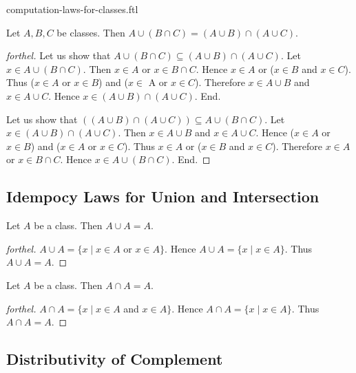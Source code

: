 \documentclass{naproche-library}
\begin{document}
\begin{smodule}{computation-laws-for-classes.ftl}
  \begin{proposition}[forthel,id=FOUNDATIONS_02_5937390721957888,printid]
    Let $A, B, C$ be classes.
    Then $A \cup (B \cap C) = (A \cup B) \cap (A \cup C)$.
  \end{proposition}
  \begin{proof}[forthel]
    Let us show that $A \cup (B \cap C) \subseteq (A \cup B) \cap (A \cup C)$.
      Let $x \in A \cup (B \cap C)$.
      Then $x \in A$ or $x \in B \cap C$.
      Hence $x \in A$ or ($x \in B$ and $x \in C$).
      Thus ($x \in A$ or $x \in B$) and ($x \in$ A or $x \in C$).
      Therefore $x \in A \cup B$ and $x \in A \cup C$.
      Hence $x \in (A \cup B) \cap (A \cup C)$.
    End.

    Let us show that $((A \cup B) \cap (A \cup C)) \subseteq A \cup (B \cap C)$. %
      Let $x \in (A \cup B) \cap (A \cup C)$.
      Then $x \in A \cup B$ and $x \in A \cup C$.
      Hence ($x \in A$ or $x \in B$) and ($x \in A$ or $x \in C$).
      Thus $x \in A$ or ($x \in B$ and $x \in C$).
      Therefore $x \in A$ or $x \in B \cap C$.
      Hence $x \in A \cup (B \cap C)$.
    End.
  \end{proof}


  \subsection*{Idempocy Laws for Union and Intersection}

  \begin{proposition}[forthel,id=FOUNDATIONS_02_2096996737351680,printid]
    Let $A$ be a class.
    Then $A \cup A = A$.
  \end{proposition}
  \begin{proof}[forthel]
    $A \cup A = \{x \mid x \in A$ or $x \in A \}$.
    Hence $A \cup A = \{ x \mid x \in A \}$.
    Thus $A \cup A = A$.
  \end{proof}

  \begin{proposition}[forthel,id=FOUNDATIONS_02_4053144145231872,printid]
    Let $A$ be a class.
    Then $A \cap A = A$.
  \end{proposition}
  \begin{proof}[forthel]
    $A \cap A = \{ x \mid x \in A$ and $x \in A \}$.
    Hence $A \cap A = \{ x \mid x \in A \}$.
    Thus $A \cap A = A$.
  \end{proof}


  \subsection*{Distributivity of Complement}


\end{smodule}
\end{document}
